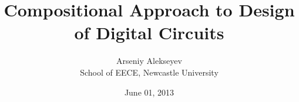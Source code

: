 \documentclass[english,british]{report}
\begin{document}
\title{Compositional Approach to Design of Digital Circuits}

\date{June 01, 2013}

\newcommand{\EECE}{School of EECE, Newcastle University}

\author{Arseniy Alekseyev\\ \EECE}

\maketitle

\tableofcontents





\end{document}
